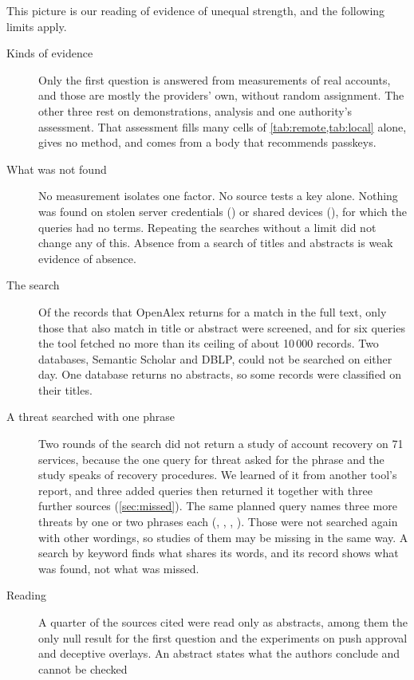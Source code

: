This picture is our reading of evidence of unequal strength, and the
following limits apply.
\begin{description}
  \item[Kinds of evidence] Only the first question is answered from
    measurements of real accounts, and those are mostly the providers'
    own, without random assignment.
    The other three rest on demonstrations, analysis and one authority's
    assessment.
    That assessment fills many cells of
    \cref{tab:remote,tab:local} alone, gives no method, and comes from a
    body that recommends passkeys.
  \item[What was not found] No measurement isolates one factor.
    No source tests a key alone.
    Nothing was found on stolen server credentials () or
    shared devices (), for which the queries had no terms.
    Repeating the searches without a limit did not change any of this.
    Absence from a search of titles and abstracts is weak evidence of
    absence.
  \item[The search] Of the records that OpenAlex returns for a match in
    the full text, only those that also match in title or abstract were
    screened, and for six queries the tool fetched no more than its
    ceiling of about 10\,000 records.
    Two databases, Semantic Scholar and DBLP, could not be searched on
    either day.
    One database returns no abstracts, so some records were classified
    on their titles.
  \item[A threat searched with one phrase] Two rounds of the search did
    not return a study of account recovery on 71 services, because the
    one query for threat  asked for the phrase
     and the study speaks of recovery procedures.
    We learned of it from another tool's report, and three added
    queries then returned it together with three further sources
    (\cref{sec:missed}).
    The same planned query names three more threats by one or two
    phrases each (, , ,
    ).
    Those were not searched again with other wordings, so studies of
    them may be missing in the same way.
    A search by keyword finds what shares its words, and its record
    shows what was found, not what was missed.
  \item[Reading] A quarter of the sources cited were read only as
    abstracts, among them the only null result for the first question
    and the experiments on push approval and deceptive overlays.
    An abstract states what the authors conclude and cannot be checked

\end{description}
